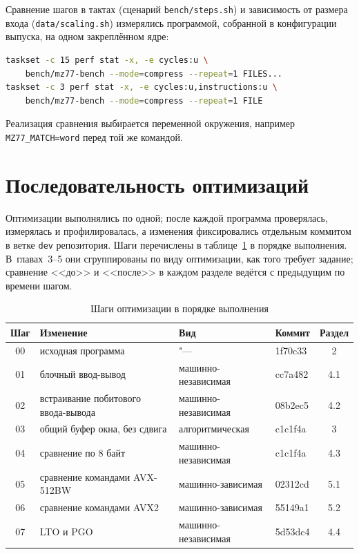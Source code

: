 Сравнение шагов в тактах (сценарий \texttt{bench/steps.sh}) и зависимость
от размера входа (\texttt{data/scaling.sh}) измерялись программой, собранной
в конфигурации выпуска, на одном закреплённом ядре:
\begin{lstlisting}[language=bash,numbers=none]
taskset -c 15 perf stat -x, -e cycles:u \
    bench/mz77-bench --mode=compress --repeat=1 FILES...
taskset -c 3 perf stat -x, -e cycles:u,instructions:u \
    bench/mz77-bench --mode=compress --repeat=1 FILE
\end{lstlisting}
Реализация сравнения выбирается переменной окружения, например
\texttt{MZ77\_MATCH=word} перед той же командой.

\section{Последовательность оптимизаций}

Оптимизации выполнялись по одной; после каждой программа проверялась,
измерялась и профилировалась, а изменения фиксировались отдельным коммитом
в ветке \texttt{dev} репозитория. Шаги перечислены в
таблице~\ref{tab:steps} в порядке выполнения. В~главах~3--5 они
сгруппированы по виду оптимизации, как того требует задание; сравнение
<<до>> и <<после>> в каждом разделе ведётся с предыдущим по времени шагом.

\begin{table}[H]
\caption{Шаги оптимизации в порядке выполнения}
\label{tab:steps}
\begin{tabletext}
\centering
\begin{tabular}{|c|l|l|l|c|}
\hline
\textbf{Шаг} & \textbf{Изменение} & \textbf{Вид} & \textbf{Коммит} & \textbf{Раздел} \\
\hline
00 & исходная программа & "--- & 1f70c33 & 2 \\
01 & блочный ввод-вывод & машинно-независимая & cc7a482 & 4.1 \\
02 & встраивание побитового ввода-вывода & машинно-независимая & 08b2ec5 & 4.2 \\
03 & общий буфер окна, без сдвига & алгоритмическая & c1c1f4a & 3 \\
04 & сравнение по 8 байт & машинно-независимая & c1c1f4a & 4.3 \\
05 & сравнение командами AVX-512BW & машинно-зависимая & 02312cd & 5.1 \\
06 & сравнение командами AVX2 & машинно-зависимая & 55149a1 & 5.2 \\
07 & LTO и PGO & машинно-независимая & 5d53dc4 & 4.4 \\
\hline
\end{tabular}
\end{tabletext}
\end{table}
